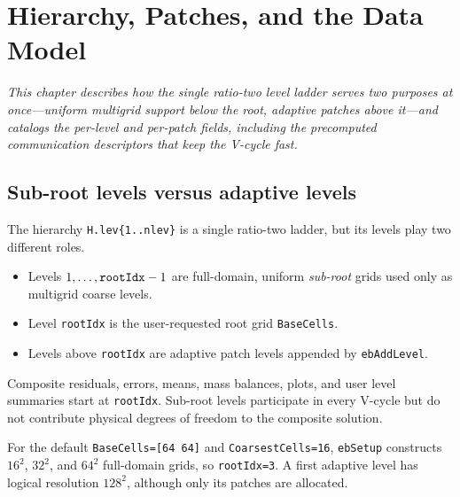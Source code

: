 \documentclass[11pt,oneside,openany]{book}
\newcommand{\code}[1]{\textnormal{\texttt{#1}}}
\begin{document}
\chapter{Hierarchy, Patches, and the Data Model}
\label{chap:hierarchy}

\emph{This chapter describes how the single ratio-two level ladder serves two purposes at once---uniform multigrid support below the root, adaptive patches above it---and catalogs the per-level and per-patch fields, including the precomputed communication descriptors that keep the V-cycle fast.}

\section{Sub-root levels versus adaptive levels}
The hierarchy \code{H.lev\{1..nlev\}} is a single ratio-two ladder, but its levels play two different roles.

\begin{itemize}
\item Levels $1,\ldots,\code{rootIdx}-1$ are full-domain, uniform \emph{sub-root} grids used only as multigrid coarse levels.
\item Level \code{rootIdx} is the user-requested root grid \code{BaseCells}.
\item Levels above \code{rootIdx} are adaptive patch levels appended by \code{ebAddLevel}.
\end{itemize}

Composite residuals, errors, means, mass balances, plots, and user level summaries start at \code{rootIdx}. Sub-root levels participate in every V-cycle but do not contribute physical degrees of freedom to the composite solution.

For the default \code{BaseCells=[64 64]} and \code{CoarsestCells=16}, \code{ebSetup} constructs $16^2$, $32^2$, and $64^2$ full-domain grids, so \code{rootIdx=3}. A first adaptive level has logical resolution $128^2$, although only its patches are allocated.
\end{document}
